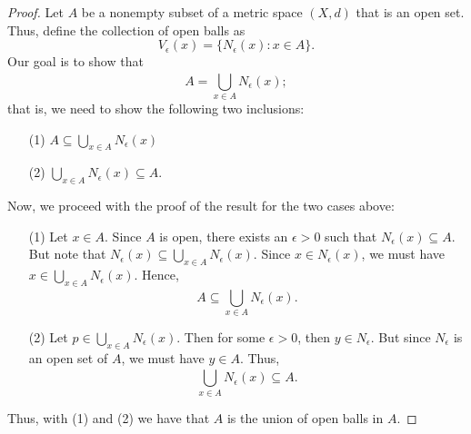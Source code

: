 \documentclass[a4paper]{article}
\begin{document}
\begin{enumerate}
    \begin{proof}
    Let \( A  \) be a nonempty subset of a metric space \( (X,d) \) that is an open set. Thus, define the collection of open balls as
    \[  {V}_{\epsilon}(x) = \{ {N}_{\epsilon}(x) : x \in A   \}. \]
    Our goal is to show that 
    \[  A = \bigcup_{ x \in A  }^{  } {N}_{\epsilon}(x); \]
    that is, we need to show the following two inclusions:
    \begin{enumerate}
        \item[(1)] \( A \subseteq \bigcup_{ x \in A  }^{  }  {N}_{\epsilon}(x) \)
        \item[(2)] \( \bigcup_{ x \in A  }^{  }  {N}_{\epsilon}(x) \subseteq A. \)
    \end{enumerate}
    Now, we proceed with the proof of the result for the two cases above:
    \begin{enumerate}
        \item[(1)] Let \( x \in A  \). Since \( A  \) is open, there exists an \( \epsilon > 0  \) such that \( {N}_{\epsilon}(x) \subseteq  A  \). But note that \( {N}_{\epsilon}(x) \subseteq  \bigcup_{ x \in A  }^{  }  {N}_{\epsilon}(x) \). Since \( x \in {N}_{\epsilon}(x) \), we must have \( x \in \bigcup_{ x \in A  }^{  } {N}_{\epsilon}(x)  \). Hence, 
            \[  A \subseteq \bigcup_{ x \in A  }^{  } {N}_{\epsilon}(x). \]
        \item[(2)] Let \( p \in \bigcup_{ x \in A  }^{  } {N}_{\epsilon}(x) \). Then for some \( \epsilon > 0 \), then \( y \in {N}_{\epsilon}  \). But since \( {N}_{\epsilon} \) is an open set of \( A  \), we must have \( y \in A  \). Thus,
            \[  \bigcup_{ x \in A  }^{   }  {N}_{\epsilon}(x) \subseteq  A. \]
    \end{enumerate}
    Thus, with (1) and (2) we have that \( A  \) is the union of open balls in \( A  \).


\end{proof}
\end{enumerate}
\end{document}
